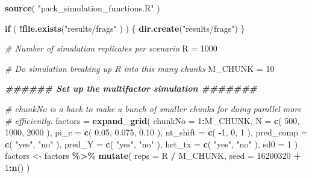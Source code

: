 \documentclass[
]{book}
\newenvironment{Shaded}{\begin{snugshade}}{\end{snugshade}}
\newcommand{\AttributeTok}[1]{\textcolor[rgb]{0.13,0.29,0.53}{#1}}
\newcommand{\CommentTok}[1]{\textcolor[rgb]{0.56,0.35,0.01}{\textit{#1}}}
\newcommand{\ControlFlowTok}[1]{\textcolor[rgb]{0.13,0.29,0.53}{\textbf{#1}}}
\newcommand{\DecValTok}[1]{\textcolor[rgb]{0.00,0.00,0.81}{#1}}
\newcommand{\DocumentationTok}[1]{\textcolor[rgb]{0.56,0.35,0.01}{\textbf{\textit{#1}}}}
\newcommand{\FloatTok}[1]{\textcolor[rgb]{0.00,0.00,0.81}{#1}}
\newcommand{\FunctionTok}[1]{\textcolor[rgb]{0.13,0.29,0.53}{\textbf{#1}}}
\newcommand{\NormalTok}[1]{#1}
\newcommand{\OtherTok}[1]{\textcolor[rgb]{0.56,0.35,0.01}{#1}}
\newcommand{\SpecialCharTok}[1]{\textcolor[rgb]{0.81,0.36,0.00}{\textbf{#1}}}
\newcommand{\StringTok}[1]{\textcolor[rgb]{0.31,0.60,0.02}{#1}}
\begin{document}
\begin{Shaded}
\begin{Highlighting}[]
\FunctionTok{source}\NormalTok{( }\StringTok{"pack\_simulation\_functions.R"}\NormalTok{ )}

\ControlFlowTok{if}\NormalTok{ ( }\SpecialCharTok{!}\FunctionTok{file.exists}\NormalTok{(}\StringTok{"results/frags"}\NormalTok{ ) ) \{}
    \FunctionTok{dir.create}\NormalTok{(}\StringTok{"results/frags"}\NormalTok{)}
\NormalTok{\}}

\CommentTok{\# Number of simulation replicates per scenario}
\NormalTok{R }\OtherTok{=} \DecValTok{1000}

\CommentTok{\# Do simulation breaking up R into this many chunks}
\NormalTok{M\_CHUNK }\OtherTok{=} \DecValTok{10}

\DocumentationTok{\#\#\#\#\#\# Set up the multifactor simulation \#\#\#\#\#\#\#}

\CommentTok{\# chunkNo is a hack to make a bunch of smaller chunks for doing parallel more}
\CommentTok{\# efficiently.}
\NormalTok{factors }\OtherTok{=} \FunctionTok{expand\_grid}\NormalTok{( }\AttributeTok{chunkNo =} \DecValTok{1}\SpecialCharTok{:}\NormalTok{M\_CHUNK,}
                       \AttributeTok{N =} \FunctionTok{c}\NormalTok{( }\DecValTok{500}\NormalTok{, }\DecValTok{1000}\NormalTok{, }\DecValTok{2000}\NormalTok{ ),}
                       \AttributeTok{pi\_c =} \FunctionTok{c}\NormalTok{( }\FloatTok{0.05}\NormalTok{, }\FloatTok{0.075}\NormalTok{, }\FloatTok{0.10}\NormalTok{ ),}
                       \AttributeTok{nt\_shift =} \FunctionTok{c}\NormalTok{( }\SpecialCharTok{{-}}\DecValTok{1}\NormalTok{, }\DecValTok{0}\NormalTok{, }\DecValTok{1}\NormalTok{ ),}
                       \AttributeTok{pred\_comp =} \FunctionTok{c}\NormalTok{( }\StringTok{"yes"}\NormalTok{, }\StringTok{"no"}\NormalTok{ ),}
                       \AttributeTok{pred\_Y =} \FunctionTok{c}\NormalTok{( }\StringTok{"yes"}\NormalTok{, }\StringTok{"no"}\NormalTok{ ),}
                       \AttributeTok{het\_tx =} \FunctionTok{c}\NormalTok{( }\StringTok{"yes"}\NormalTok{, }\StringTok{"no"}\NormalTok{ ),}
                       \AttributeTok{sd0 =} \DecValTok{1}
\NormalTok{                       )}
\NormalTok{factors }\OtherTok{\textless{}{-}}\NormalTok{ factors }\SpecialCharTok{\%\textgreater{}\%} \FunctionTok{mutate}\NormalTok{(}
    \AttributeTok{reps =}\NormalTok{ R }\SpecialCharTok{/}\NormalTok{ M\_CHUNK,}
    \AttributeTok{seed =} \DecValTok{16200320} \SpecialCharTok{+} \DecValTok{1}\SpecialCharTok{:}\FunctionTok{n}\NormalTok{()}
\NormalTok{)}
\end{Highlighting}
\end{Shaded}
\end{document}
